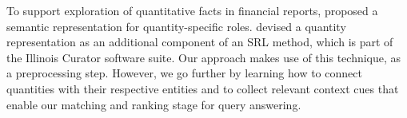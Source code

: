 To support exploration of quantitative facts in financial reports, \cite{Lamm2018QSRLA} proposed a 
semantic representation for quantity-specific roles.
\cite{DBLP:journals/tacl/RoyVR15} devised a quantity representation as an additional component of
an SRL method, which is part of the Illinois Curator software suite.
%
Our approach makes use of this technique,
as a preprocessing step.
However, we go further by 
learning how to connect quantities with their
respective entities and to collect relevant 
context cues that enable our matching and
ranking stage for query answering.


